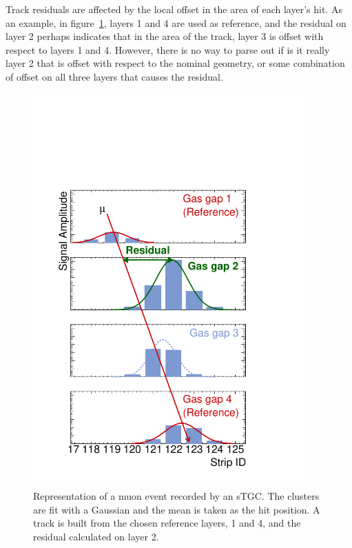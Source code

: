 Track residuals are affected by the local offset in the area of each layer's hit. As an example, in figure~\ref{fig:fake_event_display}, layers 1 and 4 are used as reference, and the residual on layer 2 perhaps indicates that in the area of the track, layer 3 is offset with respect to layers 1 and 4. However, there is no way to parse out if is it really layer 2 that is offset with respect to the nominal geometry, or some combination of offset on all three layers that causes the residual.

\begin{figure}
    \centering
    \includegraphics[width = 0.95\textwidth]{figures/figure_fake_event_display.pdf}
    \caption{Representation of a muon event recorded by an sTGC. The clusters are fit with a Gaussian and the mean is taken as the hit position. A track is built from the chosen reference layers, 1 and 4, and the residual calculated on layer 2.}
    \label{fig:fake_event_display}
\end{figure}

